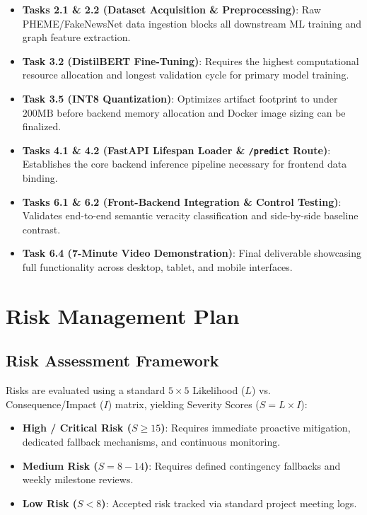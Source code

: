 \documentclass[11pt, a4paper]{article}
\newcommand{\code}[1]{\texttt{\small #1}}
\begin{document}
\begin{itemize}
  \item \textbf{Tasks 2.1 \& 2.2 (Dataset Acquisition \& Preprocessing)}: Raw PHEME/FakeNewsNet data ingestion blocks all downstream ML training and graph feature extraction.
  \item \textbf{Task 3.2 (DistilBERT Fine-Tuning)}: Requires the highest computational resource allocation and longest validation cycle for primary model training.
  \item \textbf{Task 3.5 (INT8 Quantization)}: Optimizes artifact footprint to under $200\text{MB}$ before backend memory allocation and Docker image sizing can be finalized.
  \item \textbf{Tasks 4.1 \& 4.2 (FastAPI Lifespan Loader \& \code{/predict} Route)}: Establishes the core backend inference pipeline necessary for frontend data binding.
  \item \textbf{Tasks 6.1 \& 6.2 (Front-Backend Integration \& Control Testing)}: Validates end-to-end semantic veracity classification and side-by-side baseline contrast.
  \item \textbf{Task 6.4 (7-Minute Video Demonstration)}: Final deliverable showcasing full functionality across desktop, tablet, and mobile interfaces.
\end{itemize}

\section{Risk Management Plan}
\label{sec:risk-management}

\subsection{Risk Assessment Framework}
Risks are evaluated using a standard $5 \times 5$ Likelihood ($L$) vs. Consequence/Impact ($I$) matrix, yielding Severity Scores ($S = L \times I$):
\begin{itemize}
  \item \textbf{High / Critical Risk ($S \ge 15$)}: Requires immediate proactive mitigation, dedicated fallback mechanisms, and continuous monitoring.
  \item \textbf{Medium Risk ($S = 8 - 14$)}: Requires defined contingency fallbacks and weekly milestone reviews.
  \item \textbf{Low Risk ($S < 8$)}: Accepted risk tracked via standard project meeting logs.
\end{itemize}
\end{document}
